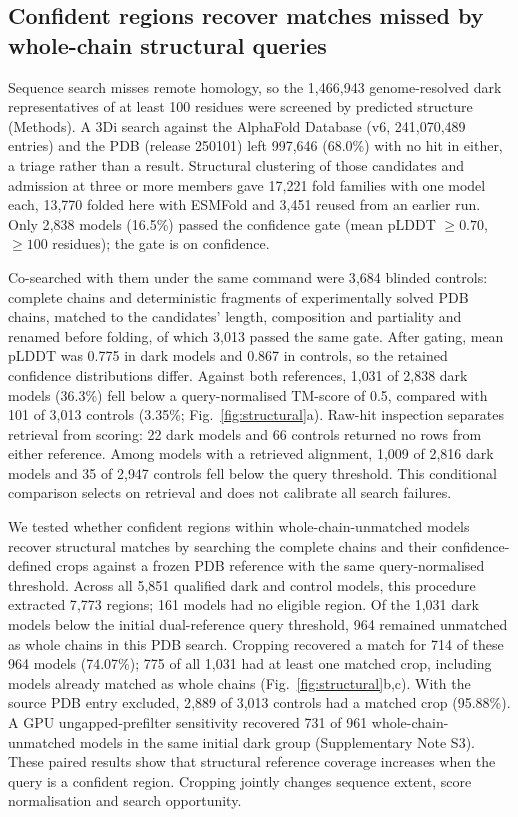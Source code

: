 \documentclass[11pt]{article}
\begin{document}
\subsection*{Confident regions recover matches missed by whole-chain structural queries}

Sequence search misses remote homology, so the 1{,}466{,}943 genome-resolved dark representatives
of at least 100 residues were screened by predicted structure (Methods). A 3Di search against the
AlphaFold Database (v6, 241{,}070{,}489 entries) and the PDB (release 250101) left 997{,}646
(68.0\%) with no hit in either, a triage rather than a result. Structural clustering of those
candidates and admission at three or more members gave 17{,}221 fold families with one model each,
13{,}770 folded here with ESMFold and 3{,}451 reused from an earlier run. Only 2{,}838 models
(16.5\%) passed the confidence gate (mean pLDDT $\geq 0.70$, $\geq 100$ residues); the gate is on
confidence.

Co-searched with them under the same command were 3{,}684 blinded controls: complete chains and
deterministic fragments of experimentally solved PDB chains, matched to the candidates' length,
composition and partiality and renamed before folding, of which 3{,}013 passed the same gate. After gating, mean pLDDT was 0.775 in dark models and 0.867 in controls, so the retained confidence distributions differ.
Against both references, 1{,}031 of 2{,}838 dark models (36.3\%) fell below a query-normalised
TM-score of 0.5, compared with 101 of 3{,}013 controls (3.35\%; Fig.~\ref{fig:structural}a).
Raw-hit inspection separates retrieval from scoring: 22 dark models and 66 controls returned
no rows from either reference. Among models with a retrieved alignment, 1{,}009 of 2{,}816 dark
models and 35 of 2{,}947 controls fell below the query threshold. This conditional comparison
selects on retrieval and does not calibrate all search failures.

We tested whether confident regions within whole-chain-unmatched models recover structural
matches by searching the complete chains and their confidence-defined crops against a frozen
PDB reference with the same query-normalised threshold. Across all 5{,}851 qualified dark and
control models, this procedure extracted 7{,}773 regions; 161 models had no eligible region.
Of the 1{,}031 dark models below the initial dual-reference query threshold, 964 remained
unmatched as whole chains in this PDB search. Cropping recovered a match for 714 of these
964 models (74.07\%); 775 of all 1{,}031 had at least one matched crop, including models already
matched as whole chains (Fig.~\ref{fig:structural}b,c). With the source PDB entry excluded,
2{,}889 of 3{,}013 controls had a matched crop (95.88\%). A GPU ungapped-prefilter sensitivity
recovered 731 of 961 whole-chain-unmatched models in the same initial dark group
(Supplementary Note S3). These paired results show that structural reference coverage increases
when the query is a confident region. Cropping jointly changes sequence extent, score
normalisation and search opportunity.
\end{document}
